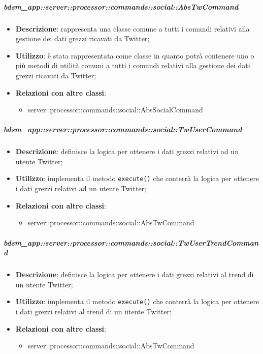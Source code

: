 
        \subparagraph{bdsm\_app::server::processor::commands::social::AbsTwCommand} %
        \label{subp:bdsm_app_server_processor_commands_social::abstwcommand}
        \begin{itemize}
          \item \textbf{Descrizione}: rappresenta una classe comune a tutti i comandi relativi alla gestione dei dati grezzi ricavati da Twitter;
          \item \textbf{Utilizzo}: è stata rappresentata come classe in quanto potrà contenere uno o più metodi di utilità comuni a tutti i comandi relativi alla gestione dei dati grezzi ricavati da Twitter;
          \item \textbf{Relazioni con altre classi}:
            \begin{itemize}
              \item server::processor::commands::social::AbsSocialCommand
            \end{itemize}
        \end{itemize}

        \subparagraph{bdsm\_app::server::processor::commands::social::TwUserCommand} %
        \label{subp:bdsm_app_server_processor_commands_social_twusercommand}
        \begin{itemize}
          \item \textbf{Descrizione}: definisce la logica per ottenere i dati grezzi relativi ad un utente Twitter;
          \item \textbf{Utilizzo}: implementa il metodo \texttt{execute()} che conterrà la logica per ottenere i dati grezzi relativi ad un utente Twitter;
          \item \textbf{Relazioni con altre classi}:
            \begin{itemize}
              \item server::processor::commands::social::AbsTwCommand
            \end{itemize}
        \end{itemize}

        \subparagraph{bdsm\_app::server::processor::commands::social::TwUserTrendCommand} %
        \label{subp:bdsm_app_server_processor_commands_social_twusertrendcommand}
        \begin{itemize}
          \item \textbf{Descrizione}: definisce la logica per ottenere i dati grezzi relativi al trend di un utente Twitter;
          \item \textbf{Utilizzo}: implementa il metodo \texttt{execute()} che conterrà la logica per ottenere i dati grezzi relativi al trend di un utente Twitter;
          \item \textbf{Relazioni con altre classi}:
            \begin{itemize}
              \item server::processor::commands::social::AbsTwCommand
            \end{itemize}
        \end{itemize}

